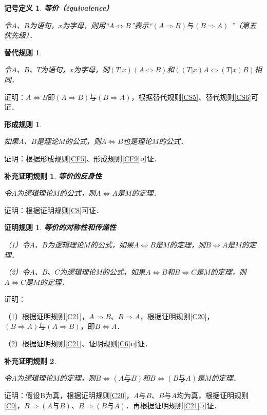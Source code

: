 \documentclass[12pt, a4paper, oneside]{book}
\newtheorem{sign}{记号定义}
\newtheorem{CS}{替代规则}
\newtheorem{CF}{形成规则}
\newtheorem{C}{证明规则}
\newtheorem{Ccor}{补充证明规则}
\begin{document}
			\begin{sign}
				\textbf{等价（équivalence）}
				\par
				令$A$、$B$为语句，$x$为字母，则用“$A\Leftrightarrow B$”表示“$(A\Rightarrow B)\text{与}(B\Rightarrow A)$ ”（第五优先级）．
			\end{sign}
			
			\begin{CS}\label{CS7}
				\hfill\par
				令$A$、$B$、$T$为语句，$x$为字母，则$(T|x)(A\Leftrightarrow B)$和$((T|x)A\Leftrightarrow (T|x)B)$相同．
			\end{CS}
			证明：$A\Leftrightarrow B$即$(A\Rightarrow B)\text{与}(B\Rightarrow A)$，根据替代规则\ref{CS5}、替代规则\ref{CS6}可证．

			\begin{CF}\label{CF10}
				\hfill\par
				如果$A$、$B$是理论$M$的公式，则$A\Leftrightarrow B$也是理论$M$的公式．
			\end{CF}
			证明：根据形成规则\ref{CF5}、形成规则\ref{CF9}可证．

			\begin{Ccor}\label{Ccor3}
				\textbf{等价的反身性}
				\par
				令$A$为逻辑理论$M$的公式，则$A\Leftrightarrow A$是$M$的定理．
			\end{Ccor}			
			证明：根据证明规则\ref{C8}可证．

			\begin{C}\label{C22}
				\textbf{等价的对称性和传递性}
				\par
				（1）令$A$、$B$为逻辑理论$M$的公式，如果$A\Leftrightarrow B$是$M$的定理，则$B\Leftrightarrow A$是$M$的定理．
				\par
				（2）令$A$、$B$、$C$为逻辑理论M的公式，如果$A\Leftrightarrow B$和$B\Leftrightarrow C$是$M$的定理，则$A\Leftrightarrow C$是$M$的定理．
			\end{C}
			证明：
			\par
			（1）根据证明规则\ref{C21}，$A\Rightarrow B$、$B\Rightarrow A$，根据证明规则\ref{C20}，$(B\Rightarrow A)\text{与}(A\Rightarrow B)$，即$B\Leftrightarrow A$．
			\par
			（2）根据证明规则\ref{C21}、证明规则\ref{C6}可证．
			
			\begin{Ccor}\label{Ccor4}
				\hfill\par
				令$A$为逻辑理论$M$的定理，则$B\Leftrightarrow (A\text{与}B)$和$B\Leftrightarrow (B\text{与}A)$是$M$的定理．
			\end{Ccor}
			证明：假设B为真，根据证明规则\ref{C20}，$A\text{与}B$、$B\text{与}A$均为真，根据证明规则\ref{C9}，$B\Rightarrow (A\text{与}B)$、$B\Rightarrow (B\text{与}A)$．再根据证明规则\ref{C21}可证．
		
\end{document}
